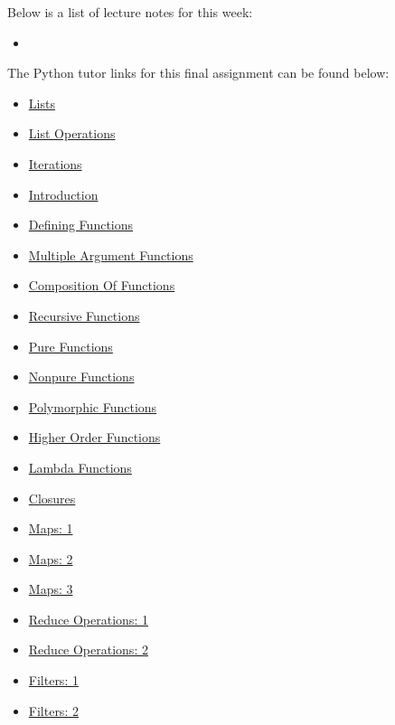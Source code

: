 \noindent Below is a list of lecture notes for this week:

\begin{itemize}
    \item {}
\end{itemize}

\noindent The Python tutor links for this final assignment can be found below:

\begin{itemize}
    \item \href{https://pythontutor.com/visualize.html#mode=edit}{Lists}
    \item \href{https://pythontutor.com/visualize.html#mode=edit}{List Operations}
    \item \href{https://pythontutor.com/visualize.html#mode=edit}{Iterations}
    \item \href{https://pythontutor.com/visualize.html#mode=display}{Introduction}
    \item \href{https://pythontutor.com/visualize.html#mode=display}{Defining Functions}
    \item \href{https://pythontutor.com/visualize.html#mode=edit}{Multiple Argument Functions}
    \item \href{https://pythontutor.com/visualize.html#mode=edit}{Composition Of Functions}
    \item \href{https://pythontutor.com/visualize.html#mode=edit}{Recursive Functions}
    \item \href{https://pythontutor.com/visualize.html#mode=edit}{Pure Functions}
    \item \href{https://pythontutor.com/visualize.html#mode=edit}{Nonpure Functions}
    \item \href{https://pythontutor.com/visualize.html#mode=edit}{Polymorphic Functions}
    \item \href{https://pythontutor.com/visualize.html#mode=edit}{Higher Order Functions}
    \item \href{https://pythontutor.com/visualize.html#mode=edit}{Lambda Functions}
    \item \href{https://pythontutor.com/visualize.html#mode=edit}{Closures}
    \item \href{https://pythontutor.com/visualize.html#mode=edit}{Maps: 1}
    \item \href{https://pythontutor.com/visualize.html#mode=edit}{Maps: 2}
    \item \href{https://pythontutor.com/visualize.html#mode=edit}{Maps: 3}
    \item \href{https://pythontutor.com/visualize.html#mode=edit}{Reduce Operations: 1}
    \item \href{https://pythontutor.com/visualize.html#mode=edit}{Reduce Operations: 2}
    \item \href{https://pythontutor.com/visualize.html#mode=edit}{Filters: 1}
    \item \href{https://pythontutor.com/visualize.html#mode=edit}{Filters: 2}
\end{itemize}

